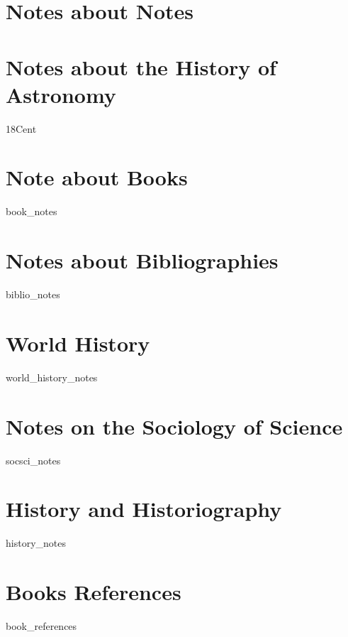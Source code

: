 \documentclass{book}
\begin{document}
\section{Notes about Notes}

\section{Notes about the History of Astronomy}
{18Cent}

\section{Note about Books}
{book_notes}

\section{Notes about Bibliographies}
{biblio_notes}

\section{World History}
{world_history_notes}


\section{Notes on the Sociology of Science}
{socsci_notes}

\section{History and Historiography}
{history_notes}

\section{Books References}
{book_references}
\end{document}
